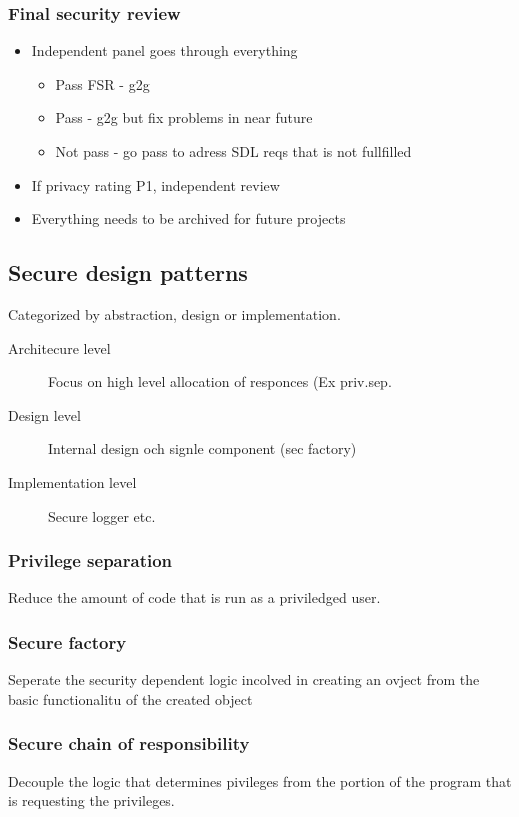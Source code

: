 \documentclass[course, english]{Notes}
\begin{document}
\subsubsection{Final security review}
\begin{itemize}
	\item Independent panel goes through everything
		\begin{itemize}
			\item Pass FSR - g2g
			\item Pass - g2g but fix problems in near future
			\item Not pass - go pass to adress SDL reqs that is not
				fullfilled
		\end{itemize}
	\item If privacy rating P1, independent review
	\item Everything needs to be archived for future projects
\end{itemize}

\subsection{Secure design patterns}
Categorized by abstraction, design or implementation.
\begin{description}
	\item[Architecure level] Focus on high level allocation of responces (Ex
		priv.sep.
	\item[Design level] Internal design och signle component (sec factory)
	\item[Implementation level] Secure logger etc.
\end{description}

\subsubsection{Privilege separation}
Reduce the amount of code that is run as a priviledged user.

\subsubsection{Secure factory}
Seperate the security dependent logic incolved in creating an ovject from the
basic functionalitu of the created object

\subsubsection{Secure chain of responsibility}
Decouple the logic that determines pivileges from the portion of the program
that is requesting the privileges.
\end{document}
